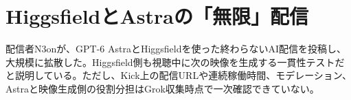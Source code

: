 \section{HiggsfieldとAstraの「無限」配信}
配信者N3onが、GPT-6 AstraとHiggsfieldを使った終わらないAI配信を投稿し、大規模に拡散した。Higgsfield側も視聴中に次の映像を生成する一貫性テストだと説明している。ただし、Kick上の配信URLや連続稼働時間、モデレーション、Astraと映像生成側の役割分担はGrok収集時点で一次確認できていない。
